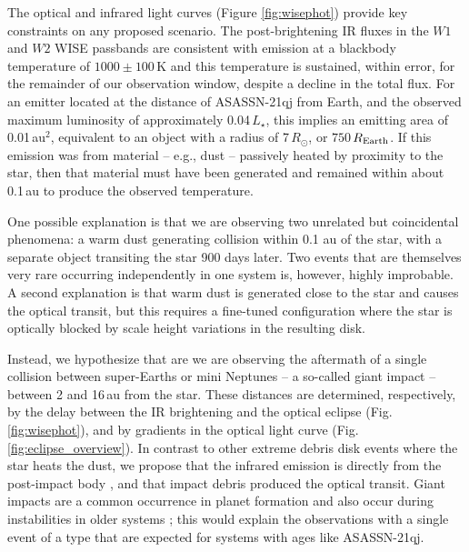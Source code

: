 \documentclass[sn-nature]{sn-jnl}%
\newcommand{\asas}{ASASSN-21qj}
\begin{document}


The optical and infrared light curves (Figure \ref{fig:wisephot}) provide key constraints on any proposed scenario.
%
The post-brightening IR fluxes in the $W1$ and $W2$ WISE passbands are consistent with emission at a blackbody temperature of $1000 \pm 100$\,K and this temperature is sustained, within error, for the remainder of our observation window, despite a decline in the total flux.
%
For an emitter located at the distance of ASASSN-21qj from Earth, and the observed  maximum luminosity of approximately 0.04\,$L_\star$, this implies an emitting area of 0.01\,au$^2$, equivalent to an object with a radius of 7\,$R_\odot$, or $750$\,$R_{\rm Earth}$.
%
If this emission was from material -- e.g., dust -- passively heated by proximity to the star, then that material must have been generated and remained within about 0.1\,au to produce the observed temperature.


One possible explanation is that we are observing two unrelated but coincidental phenomena: a warm dust generating collision within 0.1 au of the star, with a separate object transiting the star 900 days later.
%
Two events that are themselves very rare occurring independently in one system is, however, highly improbable.
%
A second explanation is that warm dust is generated close to the star and causes the optical transit, but this requires a fine-tuned configuration where the star is optically blocked by scale height variations in the resulting disk.

Instead, we hypothesize that are we are observing the aftermath of a single collision between super-Earths or mini Neptunes -- a so-called giant impact -- between 2 and 16\,au from the star. 
%
These distances are determined, respectively, by the delay between the IR brightening and the optical eclipse (Fig. \ref{fig:wisephot}), and by gradients in the optical light curve (Fig. \ref{fig:eclipse_overview}).
%
In contrast to other extreme debris disk events where the star heats the dust, we propose that the infrared emission is directly from the post-impact body \cite{Lock2017,2009ApJ...704..770M}, and that impact debris produced the optical transit.
%
Giant impacts are a common occurrence in planet formation \cite{Schlichting2018a,DAngelo2018} and also occur during instabilities in older systems \cite{Kaib2016}; this would explain the observations with a single event of a type that are expected for systems with ages like \asas{}.
\end{document}
